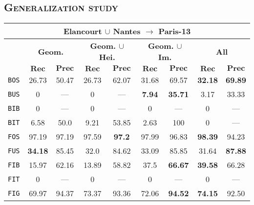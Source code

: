     \subsection{\textsc{Generalization study}}
        \begin{table}
            \footnotesize
            \begin{center}
                \begin{tabular}{|c | c c | c c | c c | c c |}
                    \hline
                    \multicolumn{9}{|c|}{\textbf{Elancourt $\cup$ Nantes $\rightarrow$ Paris-13}}\\
                    \hline
                    &\multicolumn{2}{c|}{\textbf{Geom.}} & \multicolumn{2}{c|}{\textbf{Geom. $\cup$ Hei.}} & \multicolumn{2}{c|}{\textbf{Geom. $\cup$ Im.}} & \multicolumn{2}{x{2.4cm}|}{\textbf{All}}\\
                    \cline{2-9}
                    & $\bm{Rec}$ & $\bm{Prec}$ &  $\bm{Rec}$ & $\bm{Prec}$ &  $\bm{Rec}$ & $\bm{Prec}$ &  $\bm{Rec}$ & $\bm{Prec}$ \\
                    \hline
                    \texttt{BOS} & 26.73 & 50.47 & 26.73 & 62.07 & 31.68 & 69.57 & \textbf{32.18} & \textbf{69.89} \\
                    \hline
                    \texttt{BUS} & 0 & --- & 0 & --- & \textbf{7.94} & \textbf{35.71} & 3.17 & 33.33 \\
                    \hline
                    \texttt{BIB} & 0 & --- & 0 & --- & 0 & --- & 0 & --- \\
                    \hline
                    \texttt{BIT} & 6.58 & 50.0 & 9.21 & 53.85 & 2.63 & 100 & 0 & --- \\
                    \hline
                    \texttt{FOS} & 97.19 & 97.19 & 97.59 & \textbf{97.2} & 97.99 & 96.83 & \textbf{98.39} & 94.23 \\
                    \hline
                    \texttt{FUS} & \textbf{34.18} & 85.45 & 32.0 & 84.62 & 33.09 & 85.85 & 31.64 & \textbf{87.88} \\
                    \hline
                    \texttt{FIB} & 15.97 & 62.16 & 13.89 & 58.82 & 37.5 & \textbf{66.67} & \textbf{39.58} & 66.28 \\
                    \hline
                    \texttt{FIT} & 0 & --- & 0 & --- & 0 & --- & 0 & --- \\
                    \hline
                    \texttt{FIG} & 69.97 & 94.37 & 73.37 & 93.36 & 72.06 & \textbf{94.52} & \textbf{74.15} & 92.50 \\

\end{tabular}
\end{center}
\end{table}
